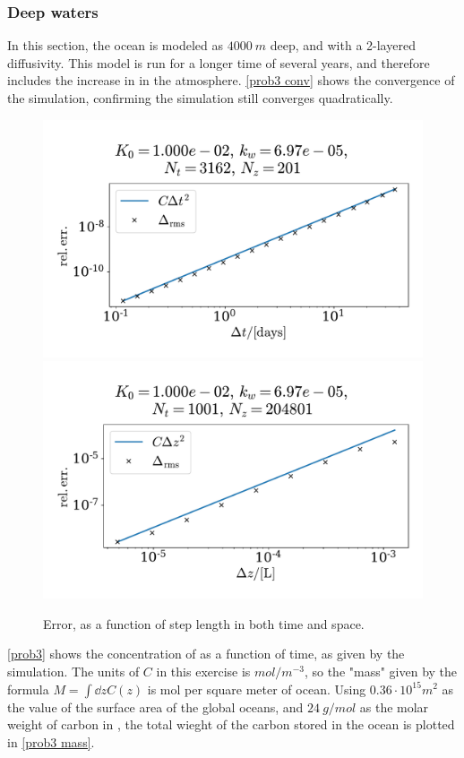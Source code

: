 \documentclass{article}
\begin{document}
    \subsubsection*{Deep waters}
    In this section, the ocean is modeled as $\SI{4000}{m}$ deep, and with a 2-layered diffusivity. This model is run for a longer time of several years, and therefore includes the increase in  in the atmosphere. \autoref{prob3 conv} shows the convergence of the simulation, confirming the simulation still converges quadratically.  

    \begin{figure}[h]
        \centering
        \includegraphics[width=.49\textwidth]{../plots/prob3_conv_test_t}
        \includegraphics[width=.49\textwidth]{../plots/prob3_conv_test_z}
        \caption{Error, as a function of step length in both time and space.}
        \label{prob3 conv}
    \end{figure}

    \autoref{prob3} shows the concentration of  as a function of time, as given by the simulation. The units of $C$ in this exercise is $\si{mol / m^{-3}}$, so the "mass" given by the formula $M = \int \dd z C(z)$ is mol per square meter of ocean. Using $0.36 \cdot 10^{15}\si{m^2}$ as the value of the surface area of the global oceans, and $\SI{24}{g / mol}$ as the molar weight of carbon in , the total wieght of the carbon stored in the ocean is plotted in \autoref{prob3 mass}.
\end{document}
